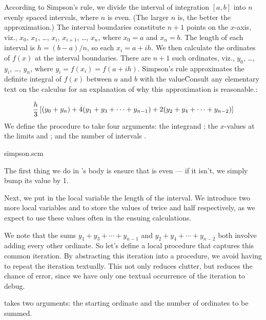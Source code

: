 According to Simpson’s rule, we divide
the interval of integration $[a,b]$
into $n$ evenly spaced
intervals, where $n$ is even. (The larger $n$
is, the better the approximation.)
The interval boundaries constitute
$n+1$ points on the $x$-axis, viz., $x_0$, $x_1$,
\dots, $x_i$, $x_{i+1}$, \dots, $x_n$, where
$x_0 = a$ and $x_n = b$.
The length of each
interval is $h = (b - a)/n$, so each $x_i = a+ih$.   We then
calculate the ordinates of $f(x)$ at the interval
boundaries.  There are $n+1$ such ordinates, viz.,
$y_0$, \dots, $y_i$, \dots, $y_n$, where  $y_i = f(x_i)
= f(a+ih)$.
Simpson’s rule
approximates the definite integral of $f(x)$ between
$a$ and $b$ with the value\f{Consult any elementary
text on the calculus for an explanation of why this
approximation is reasonable.}:

$$
{h\over 3} \left[ (y_0 + y_n)
+ 4(y_1 + y_3 + \cdots + y_{n-1})
+ 2(y_2 + y_4 + \cdots + y_{n-2}) \right]
$$
%
We define
the procedure 
to take four arguments: the integrand ; the
$x$-values at the limits  and ; and the
number of intervals .

\scmfilename simpson.scm

\n The first thing we do in
’s body is ensure that
 is even — if it isn’t, we simply bump its
value by 1.


\n Next, we put in the local variable 
the length of the interval.  We introduce two more local variables
 and  to store the values of twice 
and half  respectively, as we expect to
use these values often in the ensuing calculations.


\n We note that the sums $y_1 + y_3 + \cdots + y_{n-1}$
and $y_2 + y_4 + \cdots + y_{n-2}$ both involve adding
every other ordinate. So let’s define a local procedure
 that
captures this common iteration.  By abstracting this
iteration into a procedure, we avoid having to repeat
the iteration textually.  This not only reduces
clutter, but reduces the chance of error, since we have
only one textual occurrence of the iteration to debug.

 takes two arguments:
the starting ordinate and the number of ordinates to be summed.

